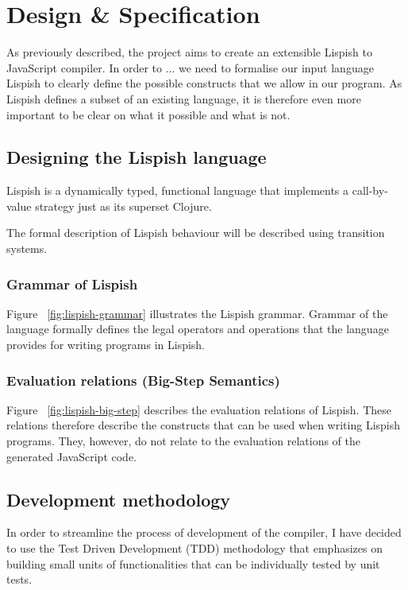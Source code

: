 \chapter{Design \& Specification}

As previously described, the project aims to create an extensible Lispish to JavaScript compiler. 
In order to ... we need to formalise our input language Lispish to clearly define the possible constructs that we allow in our program. 
As Lispish defines a subset of an existing language, it is therefore even more important to be clear on what it possible and what is not. 

\section{Designing the Lispish language}

Lispish is a dynamically typed, functional language that implements a call-by-value strategy just as its superset Clojure.

The formal description of Lispish behaviour will be described using transition systems.

\subsection{Grammar of Lispish}



Figure ~\ref{fig:lispish-grammar} illustrates the Lispish grammar. Grammar of the language formally defines the legal operators and operations that the language provides for writing programs in Lispish.

\subsection{Evaluation relations (Big-Step Semantics)}

Figure ~\ref{fig:lispish-big-step} describes the evaluation relations of Lispish. These relations therefore describe the constructs that can be used when writing Lispish programs. They, however, do not relate to the evaluation relations of the generated JavaScript code. 



\section{Development methodology}
In order to streamline the process of development of the compiler, I have decided to use the Test Driven Development (TDD) methodology that emphasizes on building small units of functionalities that can be individually tested by unit tests. 

